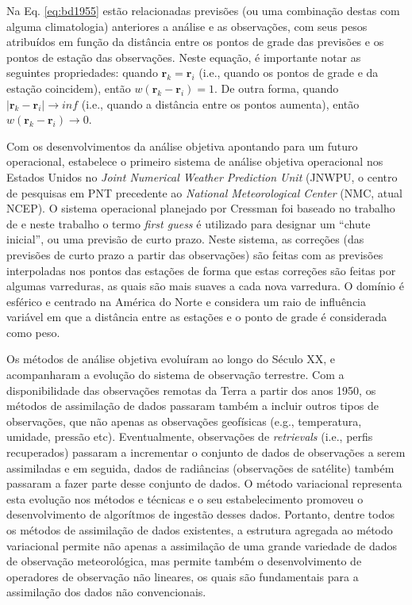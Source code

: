 Na Eq. \ref{eq:bd1955} estão relacionadas previsões (ou uma combinação destas com alguma climatologia) anteriores a análise e as observações, com seus pesos atribuídos em função da distância entre os pontos de grade das previsões e os pontos de estação das observações. Neste equação, é importante notar as seguintes propriedades: quando $\mathbf{r}_{k}=\mathbf{r}_{i}$ (i.e., quando os pontos de grade e da estação coincidem), então $w(\mathbf{r}_{k}-\mathbf{r}_{i})=1$. De outra forma, quando $|\mathbf{r}_{k}-\mathbf{r}_{i}|\rightarrow inf$ (i.e., quando a distância entre os pontos aumenta), então $w(\mathbf{r}_{k}-\mathbf{r}_{i}) \rightarrow 0$.

Com os desenvolvimentos da análise objetiva apontando para um futuro operacional,  estabelece o primeiro sistema de análise objetiva operacional nos Estados Unidos no \textit{Joint Numerical Weather Prediction Unit} (JNWPU, o centro de pesquisas em PNT precedente ao \textit{National Meteorological Center} (NMC, atual NCEP). O sistema operacional planejado por Cressman foi baseado no trabalho de  e neste trabalho o termo \textit{first guess} é utilizado para designar um ``chute inicial'', ou uma previsão de curto prazo. Neste sistema, as correções (das previsões de curto prazo a partir das observações) são feitas com as previsões interpoladas nos pontos das estações de forma que estas correções são feitas por algumas varreduras, as quais são mais suaves a cada nova varredura. O domínio é esférico e centrado na América do Norte e considera um raio de influência variável em que a distância entre as estações e o ponto de grade é considerada como peso.

Os métodos de análise objetiva evoluíram ao longo do Século XX, e acompanharam a evolução do sistema de observação terrestre. Com a disponibilidade das observações remotas da Terra a partir dos anos 1950, os métodos de assimilação de dados passaram também a incluir outros tipos de observações, que não apenas as observações geofísicas (e.g., temperatura, umidade, pressão etc). Eventualmente, observações de \textit{retrievals} (i.e., perfis recuperados) passaram a incrementar o conjunto de dados de observações a serem assimiladas e em seguida, dados de radiâncias (observações de satélite) também passaram a fazer parte desse conjunto de dados. O método variacional representa esta evolução \cite{sasaki/1958,sasaki/1970} nos métodos e técnicas e o seu estabelecimento promoveu o desenvolvimento de algorítmos de ingestão desses dados. Portanto, dentre todos os métodos de assimilação de dados existentes, a estrutura agregada ao método variacional permite não apenas a assimilação de uma grande variedade de dados de observação meteorológica, mas permite também o desenvolvimento de operadores de observação não lineares, os quais são fundamentais para a assimilação dos dados não convencionais. 

